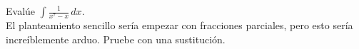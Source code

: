 \item Evalúe $\displaystyle\int \frac{1}{x^7 - x} \, dx$. \\
    El planteamiento sencillo sería empezar con fracciones parciales, pero esto sería increíblemente arduo. Pruebe con una sustitución.
